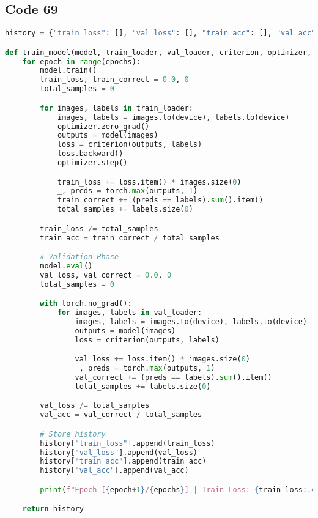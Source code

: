 \documentclass{article}
\begin{document}
\subsection*{Code 69}
\begin{lstlisting}[language=Python]
history = {"train_loss": [], "val_loss": [], "train_acc": [], "val_acc": []}

def train_model(model, train_loader, val_loader, criterion, optimizer, epochs, device):
    for epoch in range(epochs):
        model.train()
        train_loss, train_correct = 0.0, 0
        total_samples = 0

        for images, labels in train_loader:
            images, labels = images.to(device), labels.to(device)
            optimizer.zero_grad()
            outputs = model(images)
            loss = criterion(outputs, labels)
            loss.backward()
            optimizer.step()

            train_loss += loss.item() * images.size(0)
            _, preds = torch.max(outputs, 1)
            train_correct += (preds == labels).sum().item()
            total_samples += labels.size(0)

        train_loss /= total_samples
        train_acc = train_correct / total_samples

        # Validation Phase
        model.eval()
        val_loss, val_correct = 0.0, 0
        total_samples = 0

        with torch.no_grad():
            for images, labels in val_loader:
                images, labels = images.to(device), labels.to(device)
                outputs = model(images)
                loss = criterion(outputs, labels)

                val_loss += loss.item() * images.size(0)
                _, preds = torch.max(outputs, 1)
                val_correct += (preds == labels).sum().item()
                total_samples += labels.size(0)

        val_loss /= total_samples
        val_acc = val_correct / total_samples

        # Store history
        history["train_loss"].append(train_loss)
        history["val_loss"].append(val_loss)
        history["train_acc"].append(train_acc)
        history["val_acc"].append(val_acc)

        print(f"Epoch [{epoch+1}/{epochs}] | Train Loss: {train_loss:.4f} | Train Acc: {train_acc:.4f} | Val Loss: {val_loss:.4f} | Val Acc: {val_acc:.4f}")

    return history

\end{lstlisting}
\end{document}
